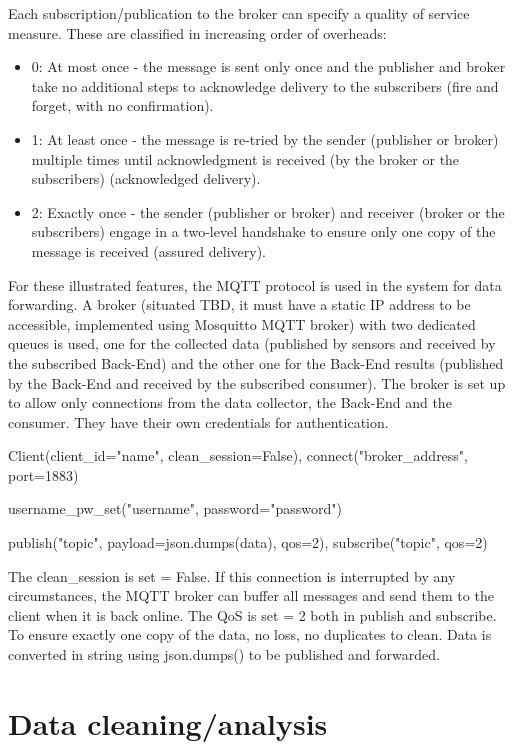 Each subscription/publication to the broker can specify a quality of service measure. These are classified in increasing order of overheads:
\begin{itemize}
  \item 0: At most once - the message is sent only once and the publisher and broker take no additional steps to acknowledge delivery to the subscribers (fire and forget, with no confirmation).
  \item 1: At least once - the message is re-tried by the sender (publisher or broker) multiple times until acknowledgment is received (by the broker or the subscribers) (acknowledged delivery).
  \item 2: Exactly once - the sender (publisher or broker) and receiver (broker or the subscribers) engage in a two-level handshake to ensure only one copy of the message is received (assured delivery).
\end{itemize}

For these illustrated features, the MQTT protocol is used in the system for data forwarding. A broker (situated TBD, it must have a static IP address to be accessible, implemented using Mosquitto MQTT broker) with two dedicated queues is used, one for the collected data (published by sensors and received by the subscribed Back-End) and the other one for the Back-End results (published by the Back-End and received by the subscribed consumer).
The broker is set up to allow only connections from the data collector, the Back-End and the consumer. They have their own credentials for authentication.

Client(client\_id="name", clean\_session=False), connect("broker\_address", port=1883)

username\_pw\_set("username", password="password")

publish("topic", payload=json.dumps(data), qos=2), subscribe("topic", qos=2)

The clean\_session is set = False. If this connection is interrupted by any circumstances, the MQTT broker can buffer all messages and send them to the client when it is back online. The QoS is set = 2 both in publish and subscribe. To ensure exactly one copy of the data, no loss, no duplicates to clean. Data is converted in string using json.dumps() to be published and forwarded.


\section{Data cleaning/analysis}
\label{sec:analysis}
\vspace{0.2 cm} 

